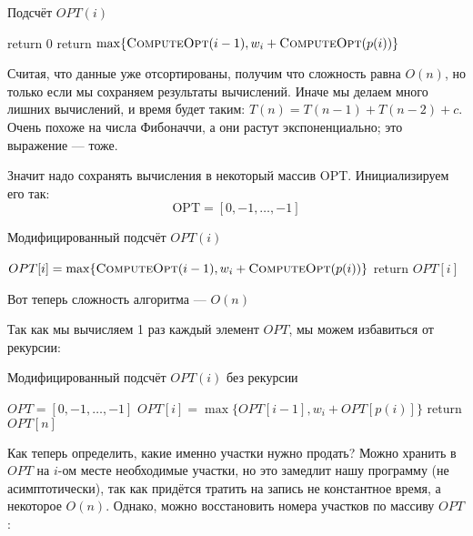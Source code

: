 \documentclass[a4paper,12pt]{article}
\begin{document}
\begin{algorithm}
	\caption{Подсчёт $OPT(i)$}
	\begin{algorithmic}[1]
				\State return 0
			\EndIf
			\State return $\max \{\textsc{ComputeOpt}(i - 1), w_i + \textsc{ComputeOpt}(p(i))\}$
		\EndFunction
	\end{algorithmic}
\end{algorithm}

Считая, что данные уже отсортированы, получим что сложность равна $O(n)$, но только если мы сохраняем результаты вычислений.
Иначе мы делаем много лишних вычислений, и время будет таким: $T(n) = T(n-1)+T(n-2)+c$.
Очень похоже на числа Фибоначчи, а они растут экспоненциально; это выражение --- тоже.


Значит надо сохранять вычисления в некоторый массив OPT.
Инициализируем его так: 
\[
\mathrm{OPT} = [0, -1, \ldots, -1]
\]

\begin{algorithm}
	\caption{Модифицированный подсчёт $OPT(i)$}
	\begin{algorithmic}[1]
				\State $OPT[i] = \max \{\textsc{ComputeOpt}(i - 1), w_i + \textsc{ComputeOpt}(p(i))\}$
			\EndIf
			\State return $OPT[i]$
		\EndFunction
	\end{algorithmic}
\end{algorithm}

Вот теперь сложность алгоритма --- $O(n)$

Так как мы вычисляем 1 раз каждый элемент $OPT$, мы можем избавиться от рекурсии:\\

\begin{algorithm}
	\caption{Модифицированный подсчёт $OPT(i)$ без рекурсии}
	\begin{algorithmic}[1]
			\State $OPT = [0, -1, \ldots, -1]$
				\State $OPT[i] = \max \{OPT[i - 1], w_i + OPT[p(i)]\}$
			\EndFor
			\State return $OPT[n]$
		\EndFunction
	\end{algorithmic}
\end{algorithm}

Как теперь определить, какие именно участки нужно продать?
Можно хранить в $OPT$ на $i$-ом месте необходимые участки, но это замедлит нашу программу (не асимптотически), так как придётся тратить на запись не константное время, а некоторое $O(n)$.
Однако, можно восстановить номера участков по массиву $OPT$:
\end{document}

